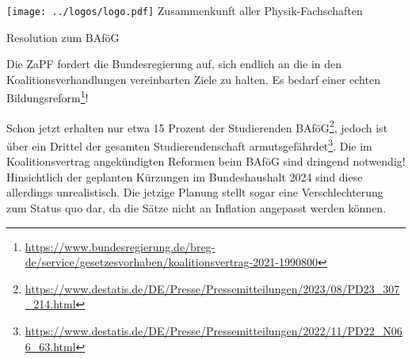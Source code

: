 \documentclass[DIV=calc]{scrartcl}
\begin{document}
\hspace{0.87\textwidth}
\begin{minipage}{120pt}
	\vspace{-1.8cm}
	\texttt{[image: ../logos/logo.pdf]}
	\centering
	\small Zusammenkunft aller Physik-Fachschaften
\end{minipage}

\begin{center}
  \huge{Resolution zum BAföG}\vspace{.25\baselineskip}\\
  \normalsize
\end{center}
\vspace{1cm}






Die ZaPF fordert die Bundesregierung auf, sich endlich an die in den Koalitionsverhandlungen vereinbarten Ziele zu halten. Es bedarf einer echten Bildungsreform\footnote{\url{https://www.bundesregierung.de/breg- de/service/gesetzesvorhaben/koalitionsvertrag-2021-1990800}}!

Schon jetzt erhalten nur etwa 15 Prozent der Studierenden BAföG\footnote{\url{https://www.destatis.de/DE/Presse/Pressemitteilungen/2023/08/PD23\_307\_214.html}}, jedoch ist über ein Drittel der gesamten Studierendenschaft armutsgefährdet\footnote{\url{https://www.destatis.de/DE/Presse/Pressemitteilungen/2022/11/PD22\_N066\_63.html}}. Die im Koalitionsvertrag angekündigten Reformen beim BAföG sind dringend notwendig! Hinsichtlich der geplanten Kürzungen im Bundeshaushalt 2024 sind diese allerdings unrealistisch. Die jetzige Planung stellt sogar eine Verschlechterung zum Status quo dar, da die Sätze nicht an Inflation angepasst werden können.
\end{document}
